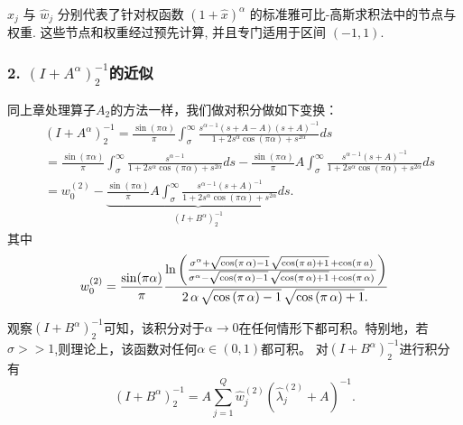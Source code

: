$\hat{x}_j$ 与 $\hat{w}_j$ 分别代表了针对权函数 $(1+\hat{x})^{\alpha}$ 的标准雅可比-高斯求积法中的节点与权重. 这些节点和权重经过预先计算, 并且专门适用于区间 $(-1, 1)$. 


\subsubsection{ 2. $(I+A^{\alpha})^{-1}_2$的近似}
同上章处理算子\(A_2\)的方法一样，我们做对积分做如下变换：
\begin{equation}
	\begin{aligned}
		&(I+A^{\alpha})^{-1}_2
		=\frac{\sin(\pi \alpha)}{\pi}\int_{\sigma}^{\infty}\frac{s^{\alpha-1}(s+A-A)(s+{A})^{-1}}{1+2s^{\alpha}\cos(\pi\alpha)+s^{2\alpha}}ds\\
		&=\frac{\sin(\pi \alpha)}{\pi}\int_{\sigma}^{\infty}\frac{s^{\alpha-1}}{1+2s^{\alpha}\cos(\pi\alpha)+s^{2\alpha}}ds
		-\frac{\sin(\pi \alpha)}{\pi}A\int_{\sigma}^{\infty}\frac{s^{\alpha-1}(s+{A})^{-1}}{1+2s^{\alpha}\cos(\pi\alpha)+s^{2\alpha}}ds\\
		&=w_0^{(2)}
		-\underbrace{\frac{\sin(\pi \alpha)}{\pi}A\int_{\sigma}^{\infty}\frac{s^{\alpha-1}(s+{A})^{-1}}{1+2s^{\alpha}\cos(\pi\alpha)+s^{2\alpha}}ds}_{(I+B^{\alpha})^{-1}_2}.
	\end{aligned}
	\label{q2}
\end{equation}
其中
\begin{equation}
	w_0^{(2)}=\frac{\sin(\pi \alpha)}{\pi}
	{{\ln \left(\frac{\sigma^{\alpha}+\sqrt{\cos \left(\pi\,\alpha \right)-1}\,\sqrt{\cos
					\left(\pi\,a\right)+1}\,+\cos \left(\pi\,a\right)\,}{\sigma^{\alpha}-\sqrt{\cos \left(\pi\,\alpha\right)-1}\,\sqrt{\cos \left(\pi
					\,\alpha\right)+1}\,+\cos \left(\pi\,\alpha \right)\,}\right)}\over{2\,\alpha\,
			\sqrt{\cos \left(\pi\,\alpha\right)-1}\,\sqrt{\cos \left(\pi\,\alpha\right)+1}.
			\,}}
\end{equation}

观察\((I+B^{\alpha})^{-1}_2\)可知，该积分对于\(\alpha \rightarrow 0\)在任何情形下都可积。特别地，若\(\sigma>>1\),则理论上，该函数对任何\(\alpha\in(0,1)\)都可积。 对\((I+B^{\alpha})^{-1}_2\)进行积分有
\begin{equation}\label{key}
	(I+B^{\alpha})^{-1}_2=A\sum_{j=1}^Q \hat{w}^{(2)}_j(\hat{\lambda}^{(2)}_j+A)^{-1}.
\end{equation}

